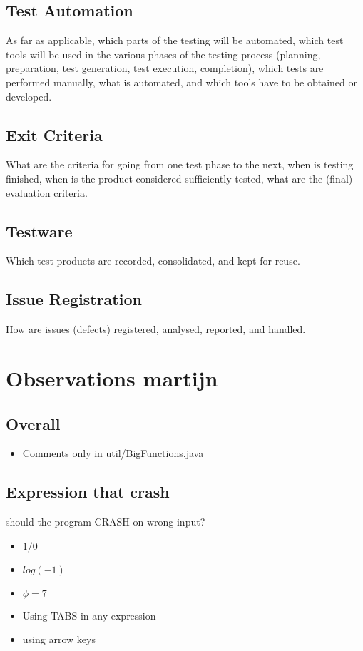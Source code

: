 \documentclass[11pt,a4paper]{article}
\begin{document}
\subsection{Test Automation}
\label{sec:orgheadline21}
As far as applicable, which parts of the testing will be automated, which test tools will be
used in the various phases of the testing process (planning, preparation, test generation, test
execution, completion), which tests are performed manually, what is automated, and which
tools have to be obtained or developed.
\subsection{Exit Criteria}
\label{sec:orgheadline22}
What are the criteria for going from one test phase to the next, when is testing finished,
when is the product considered sufficiently tested, what are the (final) evaluation criteria.
\subsection{Testware}
\label{sec:orgheadline23}
Which test products are recorded, consolidated, and kept for reuse.
\subsection{Issue Registration}
\label{sec:orgheadline24}
How are issues (defects) registered, analysed, reported, and handled.

\section{Observations martijn}
\label{sec:orgheadline30}
\subsection{Overall}
\label{sec:orgheadline26}
\begin{itemize}
\item Comments only in util/BigFunctions.java
\end{itemize}
\subsection{Expression that crash}
\label{sec:orgheadline27}
should the program CRASH on wrong input?
\begin{itemize}
\item \(1/0\)
\item \(log(-1)\)
\item \(\phi = 7\)
\item Using TABS in any expression
\item using arrow keys
\end{itemize}
\end{document}
